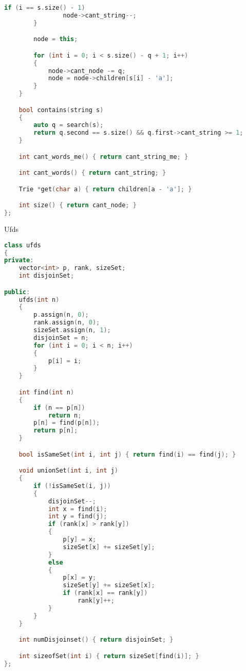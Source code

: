 \documentclass[leter]{amsart}
\begin{document}
\begin{multicols}{2}
\begin{lstlisting}[language=C++]
            if (i == s.size() - 1)
                node->cant_string--;
        }

        node = this;

        for (int i = 0; i < s.size() - q + 1; i++)
        {
            node->cant_node -= q;
            node = node->children[s[i] - 'a'];
        }
    }

    bool contains(string s)
    {
        auto q = search(s);
        return q.second == s.size() && q.first->cant_string >= 1;
    }

    int cant_words_me() { return cant_string_me; }

    int cant_words() { return cant_string; }

    Trie *get(char a) { return children[a - 'a']; }

    int size() { return cant_node; }
};

\end{lstlisting}
\end{multicols}
Ufds
\begin{multicols}{2}
\begin{lstlisting}[language=C++]
class ufds
{
private:
    vector<int> p, rank, sizeSet;
    int disjoinSet;

public:
    ufds(int n)
    {
        p.assign(n, 0);
        rank.assign(n, 0);
        sizeSet.assign(n, 1);
        disjoinSet = n;
        for (int i = 0; i < n; i++)
        {
            p[i] = i;
        }
    }

    int find(int n)
    {
        if (n == p[n])
            return n;
        p[n] = find(p[n]);
        return p[n];
    }

    bool isSameSet(int i, int j) { return find(i) == find(j); }

    void unionSet(int i, int j)
    {
        if (!isSameSet(i, j))
        {
            disjoinSet--;
            int x = find(i);
            int y = find(j);
            if (rank[x] > rank[y])
            {
                p[y] = x;
                sizeSet[x] += sizeSet[y];
            }
            else
            {
                p[x] = y;
                sizeSet[y] += sizeSet[x];
                if (rank[x] == rank[y])
                    rank[y]++;
            }
        }
    }

    int numDisjoinset() { return disjoinSet; }

    int sizeofSet(int i) { return sizeSet[find(i)]; }
};

\end{lstlisting}
\end{multicols}
\end{document}
